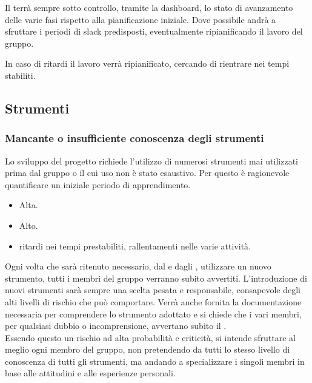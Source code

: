 \documentclass[a4paper, titlepage]{article}
\begin{document}
	Il  terrà sempre sotto controllo, tramite la dashboard, lo stato di avanzamento delle varie fasi rispetto alla pianificazione iniziale. Dove possibile andrà a sfruttare i periodi di slack predisposti, eventualmente ripianificando il lavoro del gruppo.
	
	In caso di ritardi il lavoro verrà ripianificato, cercando di rientrare nei tempi stabiliti.
	
	\subsection{Strumenti}
	\subsubsection{Mancante o insufficiente conoscenza degli strumenti}
	Lo sviluppo del progetto richiede l'utilizzo di numerosi strumenti mai utilizzati prima dal gruppo o il cui uso non è stato esaustivo. Per questo è ragionevole quantificare un iniziale periodo di apprendimento.
	
	\begin{itemize}
		\item {} Alta.
		\item {} Alto.
		\item {} ritardi nei tempi prestabiliti, rallentamenti nelle varie attività.
	\end{itemize}
	
	Ogni volta che sarà ritenuto necessario, dal  e dagli , utilizzare un nuovo strumento, tutti i membri del gruppo verranno subito avvertiti. L'introduzione di nuovi strumenti sarà sempre una scelta pesata e responsabile, consapevole degli alti livelli di rischio che può comportare. Verrà anche fornita la documentazione necessaria per comprendere lo strumento adottato e si chiede che i vari membri, per qualsiasi dubbio o incomprensione, avvertano subito il .\\
	Essendo questo un rischio ad alta probabilità e criticità, si intende sfruttare al meglio ogni membro del gruppo, non pretendendo da tutti lo stesso livello di conoscenza di tutti gli strumenti, ma andando a specializzare i singoli membri in base alle attitudini e alle esperienze personali.
	
\end{document}
